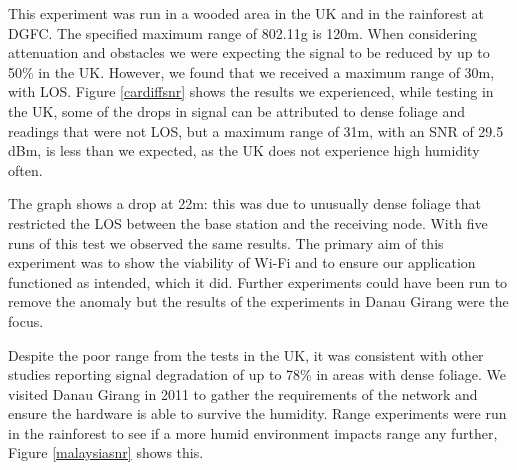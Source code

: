This experiment was run in a wooded area in the UK and in the rainforest at DGFC. The specified maximum range of 802.11g is 120m. When considering attenuation and obstacles we were expecting the signal to be reduced by up to 50\% in the UK. However, we found that we received a maximum range of 30m, with LOS. Figure \ref{cardiffsnr} shows the results we experienced, while testing in the UK, some of the drops in signal can be attributed to dense foliage and readings that were not LOS, but a maximum range of 31m, with an SNR of 29.5 dBm, is less than we expected, as the UK does not experience high humidity often.
			
	The graph shows a drop at 22m: this was due to unusually dense foliage that restricted the LOS between the base station and the receiving node. With five runs of this test we observed the same results. The primary aim of this experiment was to show the viability of Wi-Fi and to ensure our application functioned as intended, which it did. Further experiments could have been run to remove the anomaly but the results of the experiments in Danau Girang were the focus.
		 
	Despite the poor range from the tests in the UK, it was consistent with other studies reporting signal degradation of up to 78\% in areas with dense foliage. We visited Danau Girang in 2011 to gather the requirements of the network and ensure the hardware is able to survive the humidity. Range experiments were run in the rainforest to see if a more humid environment impacts range any further, Figure \ref{malaysiasnr} shows this.

